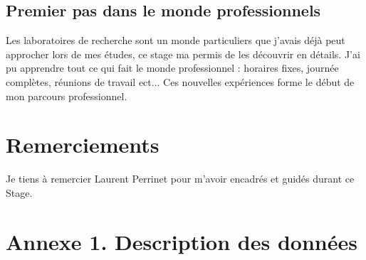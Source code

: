 \documentclass[11pt]{article}
\begin{document}
\subsection{Premier pas dans le monde professionnels}
Les laboratoires de recherche sont un monde particuliers que j'avais déjà peut approcher lors de mes études, ce stage ma permis de les découvrir en détails. J'ai pu apprendre tout ce qui fait le monde professionnel : horaires fixes, journée complètes, réunions de travail ect...
Ces nouvelles expériences forme le début de mon parcours professionnel.

\newpage


\section*{Remerciements}
Je tiens à remercier Laurent Perrinet pour m'avoir encadrés et guidés durant ce Stage.



\newpage
\section*{Annexe 1. Description des données}

\end{document}
